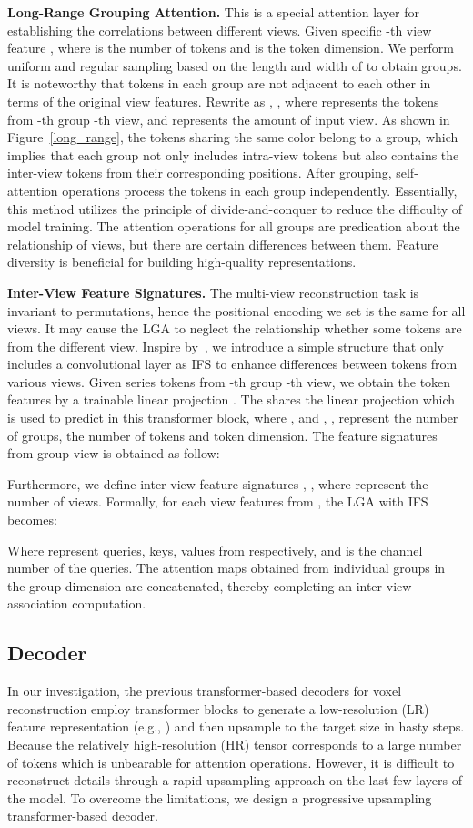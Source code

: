 \documentclass[10pt,twocolumn,letterpaper]{article}
\begin{document}
\textbf{Long-Range Grouping Attention.} This is a special attention layer for establishing the correlations between different views. Given specific -th view feature , where  is the number of tokens and  is the token dimension. We perform uniform and regular sampling based on the length and width of  to obtain  groups. It is noteworthy that tokens in each group are not adjacent to each other in terms of the original view features. Rewrite  as , , where  represents the tokens from -th group -th view, and  represents the amount of input view. As shown in Figure~\ref{long_range}, the tokens sharing the same color belong to a group, which implies that each group not only includes intra-view tokens but also contains the inter-view tokens from their corresponding positions. After grouping, self-attention operations process the tokens in each group independently. Essentially, this method utilizes the principle of divide-and-conquer to reduce the difficulty of model training. The attention operations for all groups are predication about the relationship of views, but there are certain differences between them. Feature diversity is beneficial for building high-quality representations.

\textbf{Inter-View Feature Signatures.} The multi-view reconstruction task is invariant to permutations, hence the positional encoding we set is the same for all views. It may cause the LGA to neglect the relationship whether some tokens are from the different view. Inspire by~\cite{dong2022cswin}, we introduce a simple structure that only includes a convolutional layer as IFS to enhance differences between tokens from various views. Given series tokens  from -th group -th view, we obtain the token features by a trainable linear projection . The  shares the linear projection which is used to predict  in this transformer block, where , and , ,  represent the number of groups, the number of tokens and token dimension. The feature signatures  from  group  view is obtained as follow:

Furthermore, we define inter-view feature signatures , , where  represent the number of views. Formally, for each view features  from , the LGA with IFS becomes:

Where  represent queries, keys, values from  respectively, and  is the channel number of the queries. The attention maps obtained from individual groups in the group dimension are concatenated, thereby completing an inter-view association computation.


\subsection{Decoder}
In our investigation, the previous transformer-based decoders for voxel reconstruction employ transformer blocks to generate a low-resolution (LR) feature representation (e.g., ) and then upsample to the target size in hasty steps. Because the relatively high-resolution (HR) tensor corresponds to a large number of tokens which is unbearable for attention operations. However, it is difficult to reconstruct details through a rapid upsampling approach on the last few layers of the model. To overcome the limitations, we design a progressive upsampling transformer-based decoder.
\end{document}
